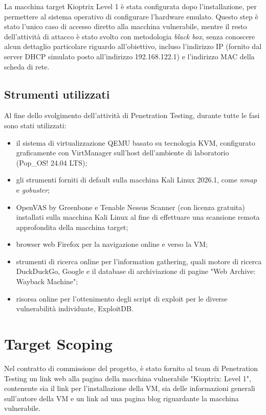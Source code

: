 \documentclass[12pt, a4paper]{article}
\begin{document}
	La macchina target Kioptrix Level 1 è stata configurata dopo l'installazione, per permettere al sistema operativo di configurare l'hardware emulato. Questo step è stato l'unico caso di accesso diretto alla macchina vulnerabile, mentre il resto dell'attività di attacco è stato svolto con metodologia \emph{black box}, senza conoscere alcun dettaglio particolare riguardo all'obiettivo, incluso l'indirizzo IP (fornito dal server DHCP simulato posto all'indirizzo 192.168.122.1) e l'indirizzo MAC della scheda di rete.
	
	\subsection{Strumenti utilizzati}
	Al fine dello svolgimento dell'attività di Penetration Testing, durante tutte le fasi sono stati utilizzati:
	\begin{itemize}
		\item il sistema di virtualizzazione QEMU basato su tecnologia KVM, configurato graficamente con VirtManager sull'host dell'ambiente di laboratorio (Pop\_OS! 24.04 LTS);
		\item gli strumenti forniti di default sulla macchina Kali Linux 2026.1, come \emph{nmap}\cite{nmap} e \emph{gobuster}\cite{gobuster};
		\item OpenVAS by Greenbone\cite{openvas} e Tenable Nessus Scanner\cite{nessus} (con licenza gratuita) installati sulla macchina Kali Linux al fine di effettuare una scansione remota approfondita della macchina target;
		\item browser web Firefox per la navigazione online e verso la VM;
		\item strumenti di ricerca online per l'information gathering, quali motore di ricerca DuckDuckGo, Google e il database di archiviazione di pagine "Web Archive: Wayback Machine"\cite{waybackmachine};
		\item risorsa online per l'ottenimento degli script di exploit per le diverse vulnerabilità individuate, ExploitDB\cite{exploitdb}.
	\end{itemize}
	
	\newpage
	\section{Target Scoping}
	Nel contratto di commissione del progetto, è stato fornito al team di Penetration Testing un link web alla pagina della macchina vulnerabile "Kioptrix: Level 1", contenente sia il link per l'installazione della VM, sia delle informazioni generali sull'autore della VM e un link ad una pagina blog riguardante la macchina vulnerabile.
	
\end{document}
